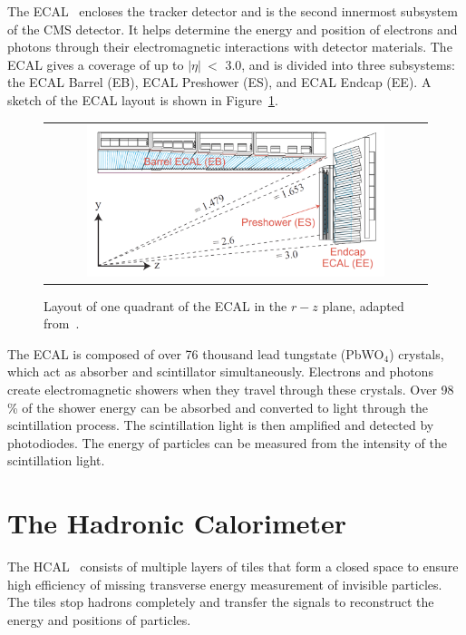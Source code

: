 The \ac{ECAL}~\cite{CMS:1997ysd} encloses the tracker detector and is the second innermost subsystem of the \ac{CMS} detector. It helps determine the energy and position of electrons and photons through their electromagnetic interactions with detector materials. The \ac{ECAL} gives a coverage of up to $|\eta|~<$ 3.0, and is divided into three subsystems: the \ac{ECAL} Barrel (EB), \ac{ECAL} Preshower (ES), and \ac{ECAL} Endcap (EE). A sketch of the \ac{ECAL} layout is shown in Figure~\ref{fig:ECAL}.

\begin{figure}[tbh!]
 \begin{center}
 \begin{tabular}{c}
 \includegraphics[width=0.8\textwidth]{figures/Part2/CMS/ECAL}
 \end{tabular}
 \caption{Layout of one quadrant of the \ac{ECAL} in the $r-z$ plane, adapted from~\cite{Benaglia:2014aqa}.}
 \label{fig:ECAL}
 \end{center}
\end{figure}

The \ac{ECAL} is composed of over 76 thousand lead tungstate (PbWO$_{4}$) crystals, which act as absorber and scintillator simultaneously. Electrons and photons create electromagnetic showers when they travel through these crystals. Over 98 \% of the shower energy can be absorbed and converted to light through the scintillation process. The scintillation light is then amplified and detected by photodiodes. The energy of particles can be measured from the intensity of the scintillation light.

\section{The Hadronic Calorimeter}
\label{sec:HCAL}

The \ac{HCAL}~\cite{CMS:1997xji} consists of multiple layers of tiles that form a closed space to ensure high efficiency of missing transverse energy measurement of invisible particles. The tiles stop hadrons completely and transfer the signals to reconstruct the energy and positions of particles.

